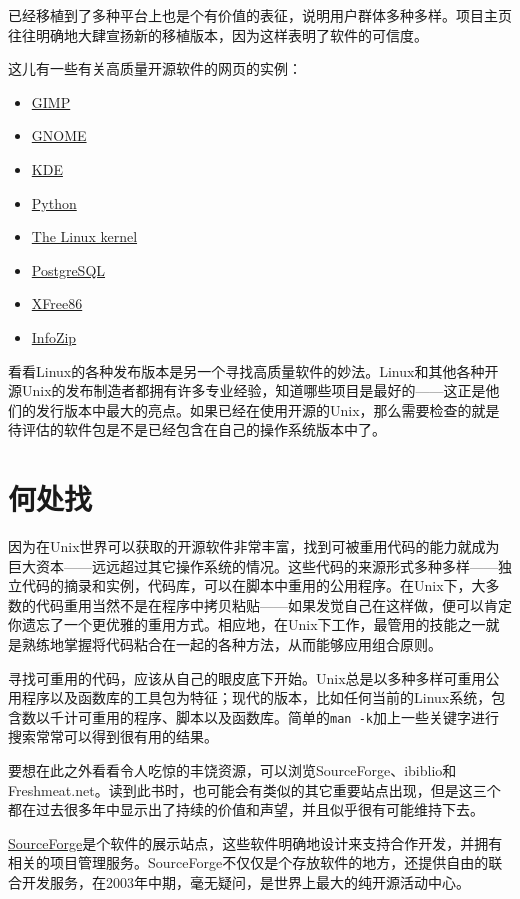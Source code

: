 \documentclass[12pt,oneside]{book}
\begin{document}
\begin{common-format}
已经移植到了多种平台上也是个有价值的表征，说明用户群体多种多样。项目主页往往明确地大肆宣扬新的移植版本，因为这样表明了软件的可信度。

这儿有一些有关高质量开源软件的网页的实例：
\begin{itemize}
\item \href{http://www.gimp.org/}{GIMP}
\item \href{http://www.gnome.org/}{GNOME}
\item \href{http://www.kde.org/}{KDE}
\item \href{http://www.python.org/}{Python}
\item \href{http://www.kernel.org/}{The Linux kernel}
\item \href{http://www.postgresql.org/}{PostgreSQL}
\item \href{http://xfree86.org/}{XFree86}
\item \href{http://www.info-zip.org/pub/infozip/}{InfoZip}
\end{itemize}

看看Linux的各种发布版本是另一个寻找高质量软件的妙法。Linux和其他各种开源Unix的发布制造者都拥有许多专业经验，知道哪些项目是最好的——这正是他们的发行版本中最大的亮点。如果已经在使用开源的Unix，那么需要检查的就是待评估的软件包是不是已经包含在自己的操作系统版本中了。


\section{何处找}
因为在Unix世界可以获取的开源软件非常丰富，找到可被重用代码的能力就成为巨大资本——远远超过其它操作系统的情况。这些代码的来源形式多种多样——独立代码的摘录和实例，代码库，可以在脚本中重用的公用程序。在Unix下，大多数的代码重用当然不是在程序中拷贝粘贴——如果发觉自己在这样做，便可以肯定你遗忘了一个更优雅的重用方式。相应地，在Unix下工作，最管用的技能之一就是熟练地掌握将代码粘合在一起的各种方法，从而能够应用组合原则。

寻找可重用的代码，应该从自己的眼皮底下开始。Unix总是以多种多样可重用公用程序以及函数库的工具包为特征；现代的版本，比如任何当前的Linux系统，包含数以千计可重用的程序、脚本以及函数库。简单的\verb+man -k+加上一些关键字进行搜索常常可以得到很有用的结果。

要想在此之外看看令人吃惊的丰饶资源，可以浏览SourceForge、ibiblio和Freshmeat.net。读到此书时，也可能会有类似的其它重要站点出现，但是这三个都在过去很多年中显示出了持续的价值和声望，并且似乎很有可能维持下去。

\href{http://www.sourceforge.net/}{SourceForge}是个软件的展示站点，这些软件明确地设计来支持合作开发，并拥有相关的项目管理服务。SourceForge不仅仅是个存放软件的地方，还提供自由的联合开发服务，在2003年中期，毫无疑问，是世界上最大的纯开源活动中心。


\end{common-format}
\end{document}
